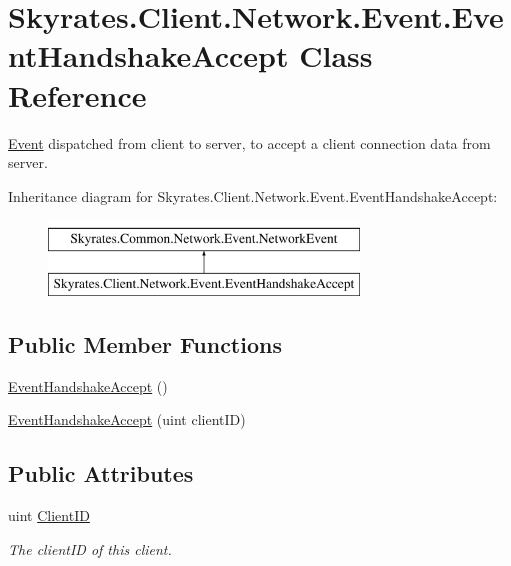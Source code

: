 \hypertarget{class_skyrates_1_1_client_1_1_network_1_1_event_1_1_event_handshake_accept}{\section{Skyrates.\-Client.\-Network.\-Event.\-Event\-Handshake\-Accept Class Reference}
\label{class_skyrates_1_1_client_1_1_network_1_1_event_1_1_event_handshake_accept}
}


\hyperlink{namespace_skyrates_1_1_client_1_1_network_1_1_event}{Event} dispatched from client to server, to accept a client connection data from server.  


Inheritance diagram for Skyrates.\-Client.\-Network.\-Event.\-Event\-Handshake\-Accept\-:\begin{figure}[H]
\begin{center}
\leavevmode
\includegraphics[height=2.000000cm]{class_skyrates_1_1_client_1_1_network_1_1_event_1_1_event_handshake_accept}
\end{center}
\end{figure}
\subsection*{Public Member Functions}
\begin{DoxyCompactItemize}
\item 
\hyperlink{class_skyrates_1_1_client_1_1_network_1_1_event_1_1_event_handshake_accept_adf323e061e26c12fb3dfe22021da7384}{Event\-Handshake\-Accept} ()
\item 
\hyperlink{class_skyrates_1_1_client_1_1_network_1_1_event_1_1_event_handshake_accept_a14a69b69b72035304b14b43304ae5299}{Event\-Handshake\-Accept} (uint client\-I\-D)
\end{DoxyCompactItemize}
\subsection*{Public Attributes}
\begin{DoxyCompactItemize}
\item 
uint \hyperlink{class_skyrates_1_1_client_1_1_network_1_1_event_1_1_event_handshake_accept_a5c48d212a4810d4f978a97cd37c27ef9}{Client\-I\-D}
\begin{DoxyCompactList}\small\item\em The client\-I\-D of this client. \end{DoxyCompactList}\end{DoxyCompactItemize}
